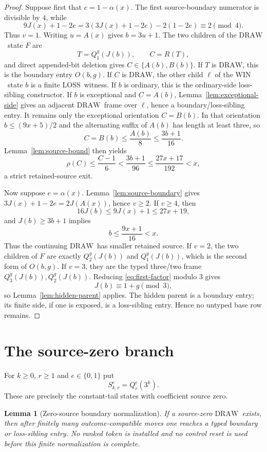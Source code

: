 \documentclass[11pt]{article}
\newtheorem{lemma}[theorem]{Lemma}
\newcommand{\WIN}{\ensuremath{\mathrm{WIN}}}
\newcommand{\LOSS}{\ensuremath{\mathrm{LOSS}}}
\newcommand{\DRAW}{\ensuremath{\mathrm{DRAW}}}
\begin{document}
\begin{proof}
Suppose first that $e=1-\alpha(x)$. The first source-boundary numerator is
divisible by $4$, while
\[
9J(x)+1-2e=3(3J(x)+1-2e)-2(1-2e)\equiv2\pmod4.
\]
Thus $v=1$. Writing $u=A(x)$ gives $b=3u+1$. The two children of the \DRAW\
state $F$ are
\[
  T=Q_1^g(J(b)),\qquad C=R(T),
\]
and direct appended-bit deletion gives
$C\in\{A(b),B(b)\}$. If $T$ is \DRAW, this is the boundary entry
$O(b,g)$. If $C$ is \DRAW, the other child $\ell$ of the \WIN\ state $b$ is a
finite \LOSS\ witness. If $b$ is ordinary, this is the ordinary-side
loss-sibling constructor. If $b$ is exceptional and $C=A(b)$,
Lemma~\ref{lem:exceptional-side} gives an adjacent \DRAW\ frame over
$\ell$, hence a boundary/loss-sibling entry. It remains only the exceptional
orientation $C=B(b)$. In that orientation
$b\le(9x+5)/2$ and the alternating suffix of $A(b)$ has length at least three,
so
\[
 C=B(b)\le\frac{A(b)}8\le\frac{3b+1}{16}.
\]
Lemma~\ref{lem:source-bound} then yields
\[
 \rho(C)\le\frac{C-1}{6}<\frac{3b+1}{96}
 \le\frac{27x+17}{192}<x,
\]
a strict retained-source exit.

Now suppose $e=\alpha(x)$. Lemma~\ref{lem:source-boundary} gives
$3J(x)+1-2e=2J(A(x))$, hence $v\ge2$. If $v\ge4$, then
\[
16J(b)\le9J(x)+1\le27x+19,
\]
and $J(b)\ge3b+1$ implies
\[
  b\le\frac{9x+1}{16}<x.
\]
Thus the continuing \DRAW\ has smaller retained source. If $v=2$, the two
children of $F$ are exactly $Q_2^g(J(b))$ and $Q_1^g(J(b))$, which is the
second form of $O(b,g)$. If $v=3$, they are the typed three/two frame
$Q_3^g(J(b)),Q_2^g(J(b))$. Reducing
\eqref{eq:first-factor} modulo $3$ gives
\[
  J(b)\equiv1+g\pmod3,
\]
so Lemma~\ref{lem:hidden-parent} applies. The hidden parent is a boundary
entry; its finite side, if one is exposed, is a loss-sibling entry. Hence no
untyped base row remains.
\end{proof}

\section{The source-zero branch}

For $k\ge0$, $r\ge1$ and $e\in\{0,1\}$ put
\[
  S_{k,r}^e=Q_r^e(3^k).
\]
These are precisely the constant-tail states with coefficient source zero.

\begin{lemma}[Zero-source boundary normalization]\label{lem:zero-source}
If a source-zero \DRAW\ exists, then after finitely many outcome-compatible
moves one reaches a typed boundary or loss-sibling entry.  No ranked token is
installed and no control reset is used before this finite normalization is
complete.
\end{lemma}
\end{document}
